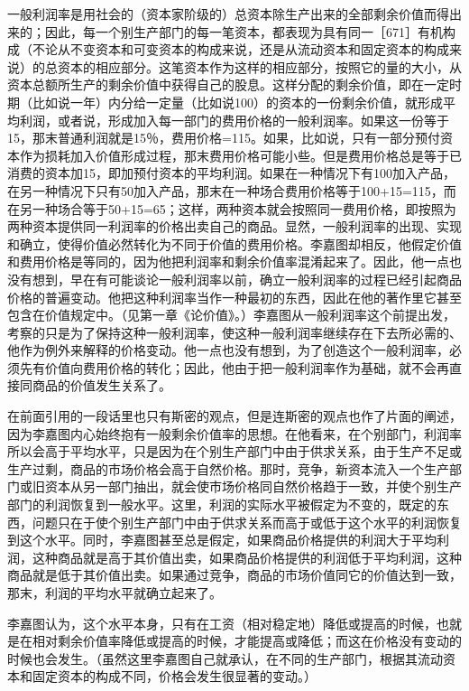 一般利润率是用社会的（资本家阶级的）总资本除生产出来的全部剩余价值而得出来的；因此，每一个别生产部门的每一笔资本，都表现为具有同一［671］有机构成（不论从不变资本和可变资本的构成来说，还是从流动资本和固定资本的构成来说）的总资本的相应部分。这笔资本作为这样的相应部分，按照它的量的大小，从资本总额所生产的剩余价值中获得自己的股息。这样分配的剩余价值，即在一定时期（比如说一年）内分给一定量（比如说100）的资本的一份剩余价值，就形成平均利润，或者说，形成加入每一部门的费用价格的一般利润率。如果这一份等于15，那末普通利润就是15％，费用价格=115。如果，比如说，只有一部分预付资本作为损耗加入价值形成过程，那末费用价格可能小些。但是费用价格总是等于已消费的资本加15，即加预付资本的平均利润。如果在一种情况下有100加入产品，在另一种情况下只有50加入产品，那末在一种场合费用价格等于100+15=115，而在另一种场合等于50+15=65；这样，两种资本就会按照同一费用价格，即按照为两种资本提供同一利润率的价格出卖自己的商品。显然，一般利润率的出现、实现和确立，使得价值必然转化为不同于价值的费用价格。李嘉图却相反，他假定价值和费用价格是等同的，因为他把利润率和剩余价值率混淆起来了。因此，他一点也没有想到，早在有可能谈论一般利润率以前，确立一般利润率的过程已经引起商品价格的普遍变动。他把这种利润率当作一种最初的东西，因此在他的著作里它甚至包含在价值规定中。（见第一章《论价值》。）李嘉图从一般利润率这个前提出发，考察的只是为了保持这种一般利润率，使这种一般利润率继续存在下去所必需的、他作为例外来解释的价格变动。他一点也没有想到，为了创造这个一般利润率，必须先有价值向费用价格的转化；因此，他由于把一般利润率作为基础，就不会再直接同商品的价值发生关系了。

在前面引用的一段话里也只有斯密的观点，但是连斯密的观点也作了片面的阐述，因为李嘉图内心始终抱有一般剩余价值率的思想。在他看来，在个别部门，利润率所以会高于平均水平，只是因为在个别生产部门中由于供求关系，由于生产不足或生产过剩，商品的市场价格会高于自然价格。那时，竞争，新资本流入一个生产部门或旧资本从另一部门抽出，就会使市场价格同自然价格趋于一致，并使个别生产部门的利润恢复到一般水平。这里，利润的实际水平被假定为不变的，既定的东西，问题只在于使个别生产部门中由于供求关系而高于或低于这个水平的利润恢复到这个水平。同时，李嘉图甚至总是假定，如果商品价格提供的利润大于平均利润，这种商品就是高于其价值出卖，如果商品价格提供的利润低于平均利润，这种商品就是低于其价值出卖。如果通过竞争，商品的市场价值同它的价值达到一致，那末，利润的平均水平就确立起来了。

李嘉图认为，这个水平本身，只有在工资（相对稳定地）降低或提高的时候，也就是在相对剩余价值率降低或提高的时候，才能提高或降低；而这在价格没有变动的时候也会发生。（虽然这里李嘉图自己就承认，在不同的生产部门，根据其流动资本和固定资本的构成不同，价格会发生很显著的变动。）

